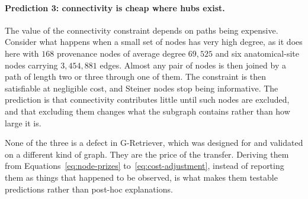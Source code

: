 \paragraph{Prediction 3: connectivity is cheap where hubs exist.} The value of
the connectivity constraint depends on paths being expensive. Consider what
happens when a small set of nodes has very high degree, as it does here with
$168$ provenance nodes of average degree $69{,}525$ and six anatomical-site nodes
carrying $3{,}454{,}881$ edges. Almost any pair of nodes is then joined by a path
of length two or three through one of them.
The constraint is then satisfiable at negligible cost, and Steiner nodes stop
being informative. The prediction is that connectivity contributes little until
such nodes are excluded, and that excluding them changes what the subgraph
contains rather than how large it is.

\medskip

None of the three is a defect in G-Retriever, which was designed for and
validated on a different kind of graph. They are the price of the transfer.
Deriving them from Equations~\ref{eq:node-prizes} to~\ref{eq:cost-adjustment},
instead of reporting them as things that happened to be observed, is what makes
them testable predictions rather than post-hoc explanations.
